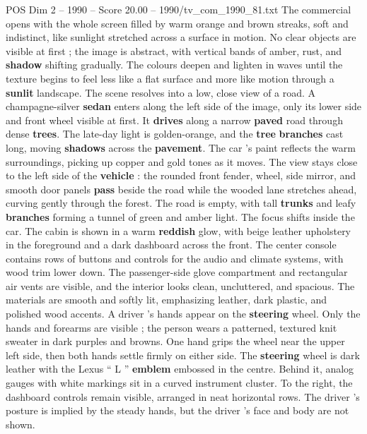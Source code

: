 \begin{textsample}{POS Dim 2 – 1990 – Score 20.00 – 1990/tv\_com\_1990\_81.txt}  \label{ex:f2_pos_035}
The commercial opens with the whole screen filled by warm orange and brown streaks, soft and indistinct, like sunlight stretched across a surface in motion.
No clear objects are visible at first ; the image is abstract, with vertical bands of amber, rust, and \textbf{shadow} shifting gradually.
The colours deepen and lighten in waves until the texture begins to feel less like a flat surface and more like motion through a \textbf{sunlit} landscape.
The scene resolves into a low, close view of a road.
A champagne-silver \textbf{sedan} enters along the left side of the image, only its lower side and front wheel visible at first.
It \textbf{drives} along a narrow \textbf{paved} road through dense \textbf{trees}.
The late-day light is golden-orange, and the \textbf{tree} \textbf{branches} cast long, moving \textbf{shadows} across the \textbf{pavement}.
The car ’s paint reflects the warm surroundings, picking up copper and gold tones as it moves.
The view stays close to the left side of the \textbf{vehicle} : the rounded front fender, wheel, side mirror, and smooth door panels \textbf{pass} beside the road while the wooded lane stretches ahead, curving gently through the forest.
The road is empty, with tall \textbf{trunks} and leafy \textbf{branches} forming a tunnel of green and amber light.
The focus shifts inside the car.
The cabin is shown in a warm \textbf{reddish} glow, with beige leather upholstery in the foreground and a dark dashboard across the front.
The center console contains rows of buttons and controls for the audio and climate systems, with wood trim lower down.
The passenger-side glove compartment and rectangular air vents are visible, and the interior looks clean, uncluttered, and spacious.
The materials are smooth and softly lit, emphasizing leather, dark plastic, and polished wood accents.
A driver ’s hands appear on the \textbf{steering} wheel.
Only the hands and forearms are visible ; the person wears a patterned, textured knit sweater in dark purples and browns.
One hand grips the wheel near the upper left side, then both hands settle firmly on either side.
The \textbf{steering} wheel is dark leather with the Lexus “ L ” \textbf{emblem} embossed in the centre.
Behind it, analog gauges with white markings sit in a curved instrument cluster.
To the right, the dashboard controls remain visible, arranged in neat horizontal rows.
The driver ’s posture is implied by the steady hands, but the driver ’s face and body are not shown.

\end{textsample}
